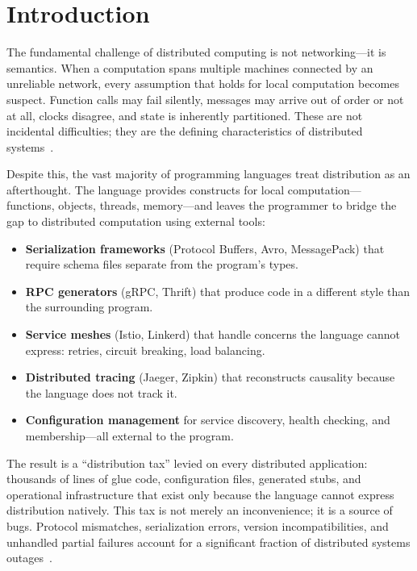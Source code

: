 \documentclass[11pt,a4paper]{article}
\begin{document}
\clearpage
\tableofcontents
\clearpage

\section{Introduction}
\label{sec:introduction}

The fundamental challenge of distributed computing is not networking---it is
semantics. When a computation spans multiple machines connected by an unreliable
network, every assumption that holds for local computation becomes suspect.
Function calls may fail silently, messages may arrive out of order or not at
all, clocks disagree, and state is inherently partitioned. These are not
incidental difficulties; they are the defining characteristics of distributed
systems~\citep{waldo1996note,lamport1978time}.

Despite this, the vast majority of programming languages treat distribution as
an afterthought. The language provides constructs for local computation---
functions, objects, threads, memory---and leaves the programmer to bridge the
gap to distributed computation using external tools:

\begin{itemize}[nosep]
  \item \textbf{Serialization frameworks} (Protocol Buffers, Avro, MessagePack)
        that require schema files separate from the program's types.
  \item \textbf{RPC generators} (gRPC, Thrift) that produce code in a
        different style than the surrounding program.
  \item \textbf{Service meshes} (Istio, Linkerd) that handle concerns the
        language cannot express: retries, circuit breaking, load balancing.
  \item \textbf{Distributed tracing} (Jaeger, Zipkin) that reconstructs
        causality because the language does not track it.
  \item \textbf{Configuration management} for service discovery, health
        checking, and membership---all external to the program.
\end{itemize}

The result is a ``distribution tax'' levied on every distributed application:
thousands of lines of glue code, configuration files, generated stubs, and
operational infrastructure that exist only because the language cannot express
distribution natively. This tax is not merely an inconvenience; it is a
source of bugs. Protocol mismatches, serialization errors, version
incompatibilities, and unhandled partial failures account for a significant
fraction of distributed systems outages~\citep{yuan2014simple}.
\end{document}
